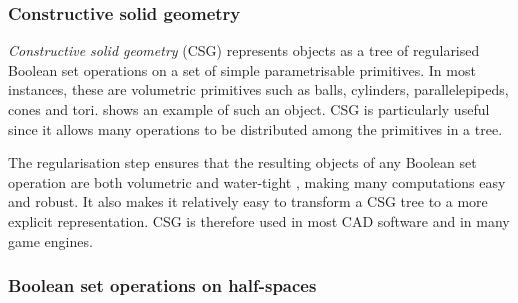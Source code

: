 \subsubsection{Constructive solid geometry}

\emph{Constructive solid geometry} (CSG) \citep[\S{}12.3]{Requicha77} represents objects as a tree of regularised Boolean set operations on a set of simple parametrisable primitives.
In most instances, these are volumetric primitives such as balls, cylinders, parallelepipeds, cones and tori.
 shows an example of such an object.
CSG is particularly useful since it allows many operations to be distributed among the primitives in a tree.

The regularisation step ensures that the resulting objects of any Boolean set operation are both volumetric and water-tight \citep{Requicha78}, making many computations easy and robust.
It also makes it relatively easy to transform a CSG tree to a more explicit representation.
CSG is therefore used in most CAD software and in many game engines.

\subsubsection{Boolean set operations on half-spaces}

